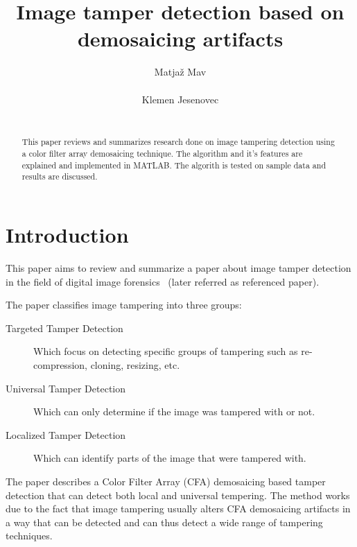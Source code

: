 \documentclass{template/acm_proc_article-sp}
\begin{document}
 

\title{Image tamper detection based on demosaicing artifacts}

\author{
\alignauthor
Matjaž Mav\\
       \\
\alignauthor
Klemen Jesenovec\\
       \\
}

\maketitle
\begin{abstract}
This paper reviews and summarizes research done on image tampering detection
using a color filter array demosaicing technique. The algorithm and it's features are
explained and implemented in MATLAB. The algorith is tested on sample data and results
are discussed.
\end{abstract}


\section{Introduction}
This paper aims to review and summarize a paper about image tamper 
detection in the field of digital image forensics~\cite{dirik2009image} (later referred as referenced paper).

The paper classifies image tampering into three groups: 
\begin{description}
    \item[Targeted Tamper Detection] Which focus on detecting specific groups of 
    tampering such as re-compression, cloning, resizing, etc. 
    \item[Universal Tamper Detection] Which can only determine if the image
    was tampered with or not.
    \item[Localized Tamper Detection] Which can identify parts of the image 
    that were tampered with.
\end{description}

The paper describes a Color Filter Array (CFA) demosaicing based tamper detection
that can detect both local and universal tempering.
The method works due to the fact that image tampering usually alters CFA demosaicing
artifacts in a way that can be detected and can thus detect a wide range of tampering
techniques. 
\end{document}
